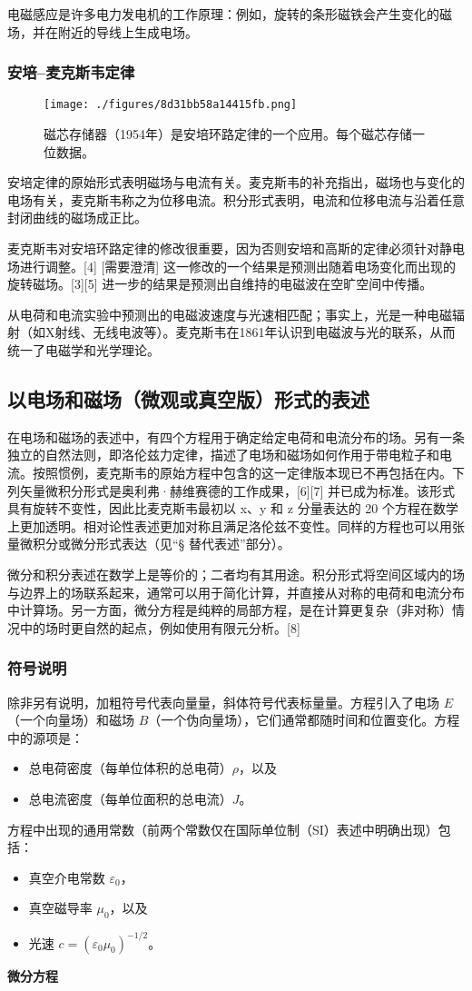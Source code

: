 电磁感应是许多电力发电机的工作原理：例如，旋转的条形磁铁会产生变化的磁场，并在附近的导线上生成电场。
\subsubsection{安培–麦克斯韦定律}
\begin{figure}[ht]
\centering
\texttt{[image: ./figures/8d31bb58a14415fb.png]}
\caption{磁芯存储器（1954年）是安培环路定律的一个应用。每个磁芯存储一位数据。} \label{fig_MAXS_5}
\end{figure}
安培定律的原始形式表明磁场与电流有关。麦克斯韦的补充指出，磁场也与变化的电场有关，麦克斯韦称之为位移电流。积分形式表明，电流和位移电流与沿着任意封闭曲线的磁场成正比。

麦克斯韦对安培环路定律的修改很重要，因为否则安培和高斯的定律必须针对静电场进行调整。[4] [需要澄清] 这一修改的一个结果是预测出随着电场变化而出现的旋转磁场。[3][5] 进一步的结果是预测出自维持的电磁波在空旷空间中传播。

从电荷和电流实验中预测出的电磁波速度与光速相匹配；事实上，光是一种电磁辐射（如X射线、无线电波等）。麦克斯韦在1861年认识到电磁波与光的联系，从而统一了电磁学和光学理论。
\subsection{以电场和磁场（微观或真空版）形式的表述}
在电场和磁场的表述中，有四个方程用于确定给定电荷和电流分布的场。另有一条独立的自然法则，即洛伦兹力定律，描述了电场和磁场如何作用于带电粒子和电流。按照惯例，麦克斯韦的原始方程中包含的这一定律版本现已不再包括在内。下列矢量微积分形式是奥利弗·赫维赛德的工作成果，[6][7] 并已成为标准。该形式具有旋转不变性，因此比麦克斯韦最初以 x、y 和 z 分量表达的 20 个方程在数学上更加透明。相对论性表述更加对称且满足洛伦兹不变性。同样的方程也可以用张量微积分或微分形式表达（见“§ 替代表述”部分）。

微分和积分表述在数学上是等价的；二者均有其用途。积分形式将空间区域内的场与边界上的场联系起来，通常可以用于简化计算，并直接从对称的电荷和电流分布中计算场。另一方面，微分方程是纯粹的局部方程，是在计算更复杂（非对称）情况中的场时更自然的起点，例如使用有限元分析。[8]
\subsubsection{符号说明}

除非另有说明，加粗符号代表向量量，斜体符号代表标量量。方程引入了电场 \( E \)（一个向量场）和磁场 \( B \)（一个伪向量场），它们通常都随时间和位置变化。方程中的源项是：
\begin{itemize}
\item 总电荷密度（每单位体积的总电荷）\( \rho \)，以及
\item 总电流密度（每单位面积的总电流）\( J \)。
\end{itemize}
方程中出现的通用常数（前两个常数仅在国际单位制（SI）表述中明确出现）包括：
\begin{itemize}
\item 真空介电常数 \( \varepsilon_0 \)，
\item 真空磁导率 \( \mu_0 \)，以及
\item 光速 \( c = (\varepsilon_0 \mu_0)^{-1/2} \)。
\end{itemize}
\textbf{微分方程}

